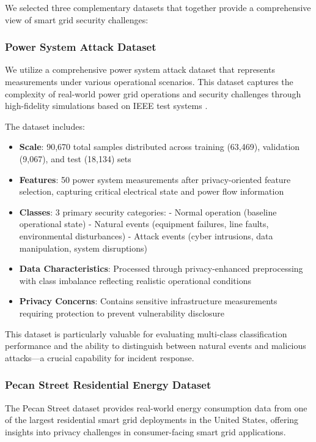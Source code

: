 \documentclass{ieeeaccess}
\theoremstyle{definition}
\begin{document}
We selected three complementary datasets that together provide a comprehensive view of smart grid security challenges:

\subsubsection{Power System Attack Dataset}

We utilize a comprehensive power system attack dataset that represents measurements under various operational scenarios. This dataset captures the complexity of real-world power grid operations and security challenges through high-fidelity simulations based on IEEE test systems \cite{pan2015developing}.

The dataset includes:
\begin{itemize}
\item \textbf{Scale}: 90,670 total samples distributed across training (63,469), validation (9,067), and test (18,134) sets
\item \textbf{Features}: 50 power system measurements after privacy-oriented feature selection, capturing critical electrical state and power flow information
\item \textbf{Classes}: 3 primary security categories:
  - Normal operation (baseline operational state)
  - Natural events (equipment failures, line faults, environmental disturbances)  
  - Attack events (cyber intrusions, data manipulation, system disruptions)
\item \textbf{Data Characteristics}: Processed through privacy-enhanced preprocessing with class imbalance reflecting realistic operational conditions
\item \textbf{Privacy Concerns}: Contains sensitive infrastructure measurements requiring protection to prevent vulnerability disclosure
\end{itemize}

This dataset is particularly valuable for evaluating multi-class classification performance and the ability to distinguish between natural events and malicious attacks—a crucial capability for incident response.

\subsubsection{Pecan Street Residential Energy Dataset}

The Pecan Street dataset \cite{pecanstreet2023dataport} provides real-world energy consumption data from one of the largest residential smart grid deployments in the United States, offering insights into privacy challenges in consumer-facing smart grid applications.
\end{document}
